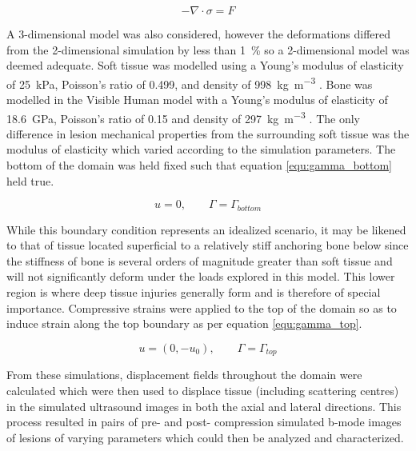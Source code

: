 			\begin{equation}
				\label{equ:fea_static}
				- {\nabla} \cdot \sigma = {F}
			\end{equation}
			
			A 3-dimensional model was also considered, however the deformations differed from the 2-dimensional simulation by less than \SI{1}{\percent} so a 2-dimensional model was deemed adequate. Soft tissue was modelled using a Young's modulus of elasticity of \SI{25}{\kPa}, Poisson's ratio of 0.499, and density of \SI{998}{\kg\per\metre\cubed} \cite{krouskop98, choi05, martin94}. Bone was modelled in the Visible Human model with a Young's modulus of elasticity of \SI{18.6}{\GPa}, Poisson's ratio of 0.15 and density of \SI{297}{\kg\per\metre\cubed} \cite{rho93,shahar07,zheng00}. The only difference in lesion mechanical properties from the surrounding soft tissue was the modulus of elasticity which varied according to the simulation parameters. The bottom of the domain was held fixed such that equation \ref{equ:gamma_bottom} held true.

			\begin{equation}
				\label{equ:gamma_bottom}
				{u} = 0, \qquad \Gamma = \Gamma_{bottom}
			\end{equation}

			While this boundary condition represents an idealized scenario, it may be likened to that of tissue located superficial to a relatively stiff anchoring bone below since the stiffness of bone is several orders of magnitude greater than soft tissue and will not significantly deform under the loads explored in this model. This lower region is where deep tissue injuries generally form and is therefore of special importance. Compressive strains were applied to the top of the domain so as to induce strain along the top boundary as per equation \ref{equ:gamma_top}.

			\begin{equation}
				\label{equ:gamma_top}
				{u} = (0, -u_0), \qquad \Gamma = \Gamma_{top}
			\end{equation}

			From these simulations, displacement fields throughout the domain were calculated which were then used to displace tissue (including scattering centres) in the simulated ultrasound images in both the axial and lateral directions. This process resulted in pairs of pre- and post- compression simulated b-mode images of lesions of varying parameters which could then be analyzed and characterized.

